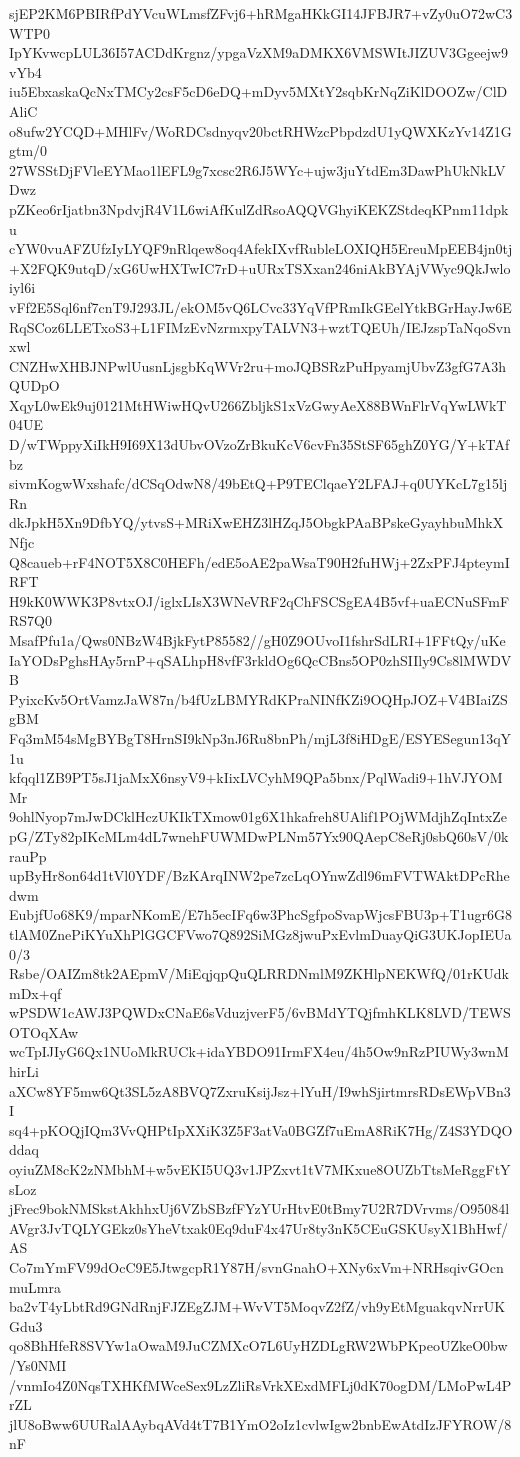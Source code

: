 sjEP2KM6PBIRfPdYVcuWLmsfZFvj6+hRMgaHKkGI14JFBJR7+vZy0uO72wC3WTP0
IpYKvwcpLUL36I57ACDdKrgnz/ypgaVzXM9aDMKX6VMSWItJIZUV3Ggeejw9vYb4
iu5EbxaskaQcNxTMCy2csF5cD6eDQ+mDyv5MXtY2sqbKrNqZiKlDOOZw/ClDAliC
o8ufw2YCQD+MHlFv/WoRDCsdnyqv20bctRHWzcPbpdzdU1yQWXKzYv14Z1Ggtm/0
27WSStDjFVleEYMao1lEFL9g7xcsc2R6J5WYc+ujw3juYtdEm3DawPhUkNkLVDwz
pZKeo6rIjatbn3NpdvjR4V1L6wiAfKulZdRsoAQQVGhyiKEKZStdeqKPnm11dpku
cYW0vuAFZUfzIyLYQF9nRlqew8oq4AfekIXvfRubleLOXIQH5EreuMpEEB4jn0tj
+X2FQK9utqD/xG6UwHXTwIC7rD+uURxTSXxan246niAkBYAjVWyc9QkJwloiyl6i
vFf2E5Sql6nf7cnT9J293JL/ekOM5vQ6LCvc33YqVfPRmIkGEelYtkBGrHayJw6E
RqSCoz6LLETxoS3+L1FIMzEvNzrmxpyTALVN3+wztTQEUh/IEJzspTaNqoSvnxwl
CNZHwXHBJNPwlUusnLjsgbKqWVr2ru+moJQBSRzPuHpyamjUbvZ3gfG7A3hQUDpO
XqyL0wEk9uj0121MtHWiwHQvU266ZbljkS1xVzGwyAeX88BWnFlrVqYwLWkT04UE
D/wTWppyXiIkH9I69X13dUbvOVzoZrBkuKcV6cvFn35StSF65ghZ0YG/Y+kTAfbz
sivmKogwWxshafc/dCSqOdwN8/49bEtQ+P9TEClqaeY2LFAJ+q0UYKcL7g15ljRn
dkJpkH5Xn9DfbYQ/ytvsS+MRiXwEHZ3lHZqJ5ObgkPAaBPskeGyayhbuMhkXNfjc
Q8caueb+rF4NOT5X8C0HEFh/edE5oAE2paWsaT90H2fuHWj+2ZxPFJ4pteymIRFT
H9kK0WWK3P8vtxOJ/iglxLIsX3WNeVRF2qChFSCSgEA4B5vf+uaECNuSFmFRS7Q0
MsafPfu1a/Qws0NBzW4BjkFytP85582//gH0Z9OUvoI1fshrSdLRI+1FFtQy/uKe
IaYODsPghsHAy5rnP+qSALhpH8vfF3rkldOg6QcCBns5OP0zhSIIly9Cs8lMWDVB
PyixcKv5OrtVamzJaW87n/b4fUzLBMYRdKPraNINfKZi9OQHpJOZ+V4BIaiZSgBM
Fq3mM54sMgBYBgT8HrnSI9kNp3nJ6Ru8bnPh/mjL3f8iHDgE/ESYESegun13qY1u
kfqql1ZB9PT5sJ1jaMxX6nsyV9+kIixLVCyhM9QPa5bnx/PqlWadi9+1hVJYOMMr
9ohlNyop7mJwDCklHczUKIkTXmow01g6X1hkafreh8UAlif1POjWMdjhZqIntxZe
pG/ZTy82pIKcMLm4dL7wnehFUWMDwPLNm57Yx90QAepC8eRj0sbQ60sV/0krauPp
upByHr8on64d1tVl0YDF/BzKArqINW2pe7zcLqOYnwZdl96mFVTWAktDPcRhedwm
EubjfUo68K9/mparNKomE/E7h5ecIFq6w3PhcSgfpoSvapWjcsFBU3p+T1ugr6G8
tlAM0ZnePiKYuXhPlGGCFVwo7Q892SiMGz8jwuPxEvlmDuayQiG3UKJopIEUa0/3
Rsbe/OAIZm8tk2AEpmV/MiEqjqpQuQLRRDNmlM9ZKHlpNEKWfQ/01rKUdkmDx+qf
wPSDW1cAWJ3PQWDxCNaE6sVduzjverF5/6vBMdYTQjfmhKLK8LVD/TEWSOTOqXAw
wcTpIJIyG6Qx1NUoMkRUCk+idaYBDO91IrmFX4eu/4h5Ow9nRzPIUWy3wnMhirLi
aXCw8YF5mw6Qt3SL5zA8BVQ7ZxruKsijJsz+lYuH/I9whSjirtmrsRDsEWpVBn3I
sq4+pKOQjIQm3VvQHPtIpXXiK3Z5F3atVa0BGZf7uEmA8RiK7Hg/Z4S3YDQOddaq
oyiuZM8cK2zNMbhM+w5vEKI5UQ3v1JPZxvt1tV7MKxue8OUZbTtsMeRggFtYsLoz
jFrec9bokNMSkstAkhhxUj6VZbSBzfFYzYUrHtvE0tBmy7U2R7DVrvms/O95084l
AVgr3JvTQLYGEkz0sYheVtxak0Eq9duF4x47Ur8ty3nK5CEuGSKUsyX1BhHwf/AS
Co7mYmFV99dOcC9E5JtwgcpR1Y87H/svnGnahO+XNy6xVm+NRHsqivGOcnmuLmra
ba2vT4yLbtRd9GNdRnjFJZEgZJM+WvVT5MoqvZ2fZ/vh9yEtMguakqvNrrUKGdu3
qo8BhHfeR8SVYw1aOwaM9JuCZMXcO7L6UyHZDLgRW2WbPKpeoUZkeO0bw/Ys0NMI
/vnmIo4Z0NqsTXHKfMWceSex9LzZliRsVrkXExdMFLj0dK70ogDM/LMoPwL4PrZL
jlU8oBww6UURalAAybqAVd4tT7B1YmO2oIz1cvlwIgw2bnbEwAtdIzJFYROW/8nF
